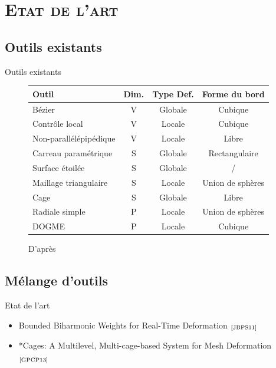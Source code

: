 \documentclass[xcolor=x11names,compress]{beamer}
\renewcommand{\(}{\begin{columns}} \renewcommand{\)}{\end{columns}}
\newcommand{\<}[1]{\begin{column}{#1}} \renewcommand{\>}{\end{column}}
\begin{document}
\section{\scshape Etat de l'art}
\subsection{Outils existants}
\begin{frame}{Outils existants}
  \begin{figure}[h]
    \begin{center}
      \begin{tabular}{|l|c|c|c|}
        \hline
        \textbf{Outil} & \textbf{Dim.} & \textbf{Type Def.} & \textbf{Forme du bord} \\
        \hline
        \hline
        Bézier & V & Globale & Cubique\\
        \hline
        Contrôle local & V & Locale & Cubique\\
        \hline
        Non-parallélépipédique & V & Locale & Libre\\
        \hline
        \hline
        Carreau paramétrique & S & Globale & Rectangulaire\\
        \hline
        Surface étoilée & S & Globale & /\\
        \hline
        Maillage triangulaire & S & Locale & Union de sphères\\
        \hline
        Cage & S & Globale & Libre\\
        \hline
        \hline
        Radiale simple & P & Locale & Union de sphères\\
        \hline
        DOGME & P & Locale & Cubique\\
        \hline
      \end{tabular}
      \caption{D'après \cite{GB08}}
    \end{center}
  \end{figure}
\end{frame}

\subsection{Mélange d'outils}

\begin{frame}{Etat de l'art}
  \begin{itemize}
  \item Bounded Biharmonic Weights for Real-Time Deformation
    $_{\text{\cite{JBPS11}}}$
  \item *Cages: A Multilevel, Multi-cage-based System for Mesh
    Deformation $_{\text{\cite{GPCP13}}}$
  \end{itemize}
\end{frame}
\end{document}
